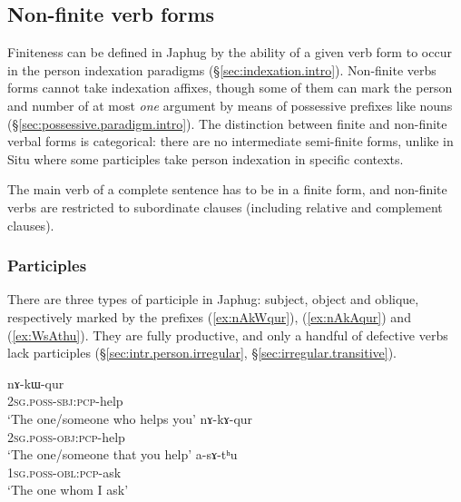  
 

\subsection{Non-finite verb forms}
Finiteness can be defined in Japhug by the ability of a given verb form to occur in the person indexation paradigms (§\ref{sec:indexation.intro}). Non-finite verbs forms cannot take indexation affixes, though some of them can mark the person and number of at most \textit{one} argument by means of possessive prefixes like nouns (§\ref{sec:possessive.paradigm.intro}). The distinction between finite and non-finite verbal forms is categorical: there are no intermediate semi-finite forms, unlike in Situ \citep{jacksonlin07} where some participles take person indexation in specific contexts.

The main verb of a complete sentence has to be in a finite form, and non-finite verbs are restricted to subordinate clauses (including relative and complement clauses). 

\subsubsection{Participles} \label{sec:participles.intro}
There are three types of participle in Japhug: subject, object and oblique, respectively marked by the prefixes  (\ref{ex:nAkWqur}),  (\ref{ex:nAkAqur}) and  (\ref{ex:WsAthu}). They are fully productive, and only a handful of defective verbs lack participles (§\ref{sec:intr.person.irregular}, §\ref{sec:irregular.transitive}).

\begin{exe}
\ex 
\begin{xlist}
\ex \label{ex:nAkWqur}
\gll nɤ-kɯ-qur \\
\textsc{2sg}.\textsc{poss}-\textsc{sbj}:\textsc{pcp}-help \\
\glt `The one/someone who helps you' 
\ex \label{ex:nAkAqur}
\gll nɤ-kɤ-qur \\
\textsc{2sg}.\textsc{poss}-\textsc{obj}:\textsc{pcp}-help \\
\glt `The one/someone that you help' 
\ex \label{ex:WsAthu}
\gll a-sɤ-tʰu \\
\textsc{1sg}.\textsc{poss}-\textsc{obl}:\textsc{pcp}-ask \\
\glt `The one whom I ask' 
\end{xlist}
\end{exe}

